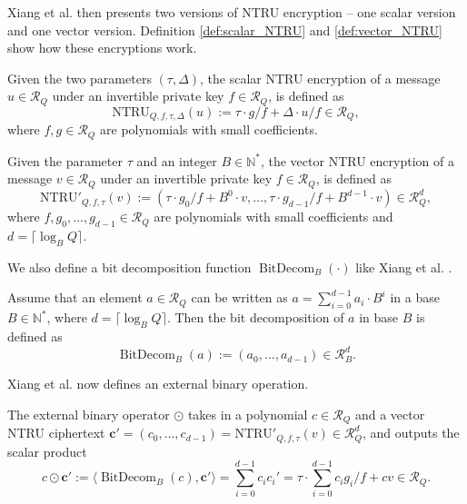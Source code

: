 Xiang et al. \cite{cite:fast_bootstrap_crypto23} then presents two versions of NTRU encryption -- one scalar version and one vector version. Definition \ref{def:scalar_NTRU} and \ref{def:vector_NTRU} show how these encryptions work.

\begin{definition}
    Given the two parameters $(\tau, \Delta)$, the scalar NTRU encryption of a message $u \in \mathcal{R}_Q$ under an invertible private key $f \in \mathcal{R}_Q$, is defined as
    $$\mathrm{NTRU}_{Q, f, \tau, \Delta}(u) := \tau \cdot g/f + \Delta \cdot u/f \in \mathcal{R}_Q,$$
    where $f, g \in \mathcal{R}_Q$ are polynomials with small coefficients.
    \label{def:scalar_NTRU}
\end{definition}

\begin{definition}
    Given the parameter $\tau$ and an integer $B \in \mathbb{N}^*$, the vector NTRU encryption of a message $v \in \mathcal{R}_Q$ under an invertible private key $f \in \mathcal{R}_Q$, is defined as
    $$\mathrm{NTRU}'_{Q, f, \tau}(v) := (\tau \cdot g_0/f + B^0\cdot v, \ldots, \tau \cdot g_{d-1}/f + B^{d-1}\cdot v) \in \mathcal{R}_Q^d,$$
    where $f, g_0, \ldots, g_{d-1} \in \mathcal{R}_Q$ are polynomials with small coefficients and $d = \lceil \log_BQ \rceil$.
    \label{def:vector_NTRU}
\end{definition}

We also define a bit decomposition function $\operatorname{BitDecom}_B(\cdot)$ like Xiang et al. \cite{cite:fast_bootstrap_crypto23}.


\begin{definition}
    Assume that an element $a \in \mathcal{R}_Q$ can be written as $a = \sum_{i=0}^{d-1}a_i\cdot B^i$ in a base $B \in \mathbb{N}^*$, where $d = \lceil \log_B Q \rceil$. Then the bit decomposition of $a$ in base $B$ is defined as $$\operatorname{BitDecom}_B(a) := (a_0, \ldots, a_{d-1}) \in \mathcal{R}_B^d.$$
\end{definition}

Xiang et al. \cite{cite:fast_bootstrap_crypto23} now defines an external binary operation.
\begin{definition}
The external binary operator $\odot$ takes in a polynomial $c \in \mathcal{R}_Q$ and a vector NTRU ciphertext $\mathbf{c}' = (c_0, \ldots, c_{d-1}) = \mathrm{NTRU}'_{Q, f, \tau}(v) \in \mathcal{R}_Q^d$, and outputs the scalar product
$$c \odot \mathbf{c}' := \langle \operatorname{BitDecom}_B(c), \mathbf{c}' \rangle = \sum_{i=0}^{d-1}c_ic_i'=\tau \cdot \sum_{i=0}^{d-1} c_i g_i / f + cv \in \mathcal{R}_Q.$$
\end{definition}

